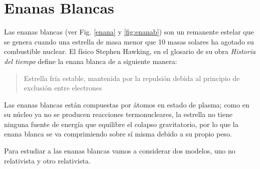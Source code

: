 \documentclass[openany]{book}
\theoremstyle{ucostyle}
\begin{document}
\section{Enanas Blancas}
Las enanas blancas (ver Fig. \ref{enana} y \ref{fig:enanab}) son un remanente estelar que se genera cuando una estrella de masa menor que 10 masas solares ha agotado su combustible nuclear. El físico Stephen Hawking, en el glosario de su obra \textit{Historia del tiempo} define la enana blanca de a siguiente manera: 
\begin{quote}
    Estrella fría estable, mantenida por la repulsión debida al principio de exclusión entre electrones
\end{quote}
Las enanas blancas están compuestas por átomos en estado de plasma; como en su núcleo ya no se producen reacciones termonucleares, la estrella no tiene ninguna fuente de energía que equilibre el colapso gravitatorio, por lo que la enana blanca se va comprimiendo sobre sí misma debido a su propio peso. 

Para estudiar a las enanas blancas vamos a considerar dos modelos, uno no relativista y otro relativista. 
\end{document}
